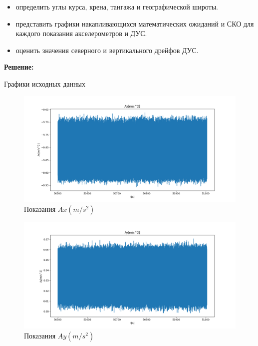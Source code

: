\documentclass[a4paper,14pt]{article}
\theoremstyle{plain} %
\theoremstyle{definition} %
\theoremstyle{remark} %
\begin{document}
{\begin{itemize}
    \item определить углы курса, крена, тангажа и географической широты.

    \item представить графики накапливающихся математических ожиданий и СКО для каждого показания акселерометров и ДУС.

    \item оценить значения северного и вертикального дрейфов ДУС.

\end{itemize}
\newpage


\textbf{Решение:}

Графики исходных данных

\begin{figure}[h!]
    \centering
    \includegraphics[width=0.99\linewidth]{Ax.png}
    \caption{Показания $Ax(m/s^2)$}
    \label{fig:ax}
\end{figure}

\begin{figure}[h!]
    \centering
    \includegraphics[width=0.99\linewidth]{Ay.png}
    \caption{Показания $Ay(m/s^2)$}
    \label{fig:ay}
\end{figure}

}
\end{document}
